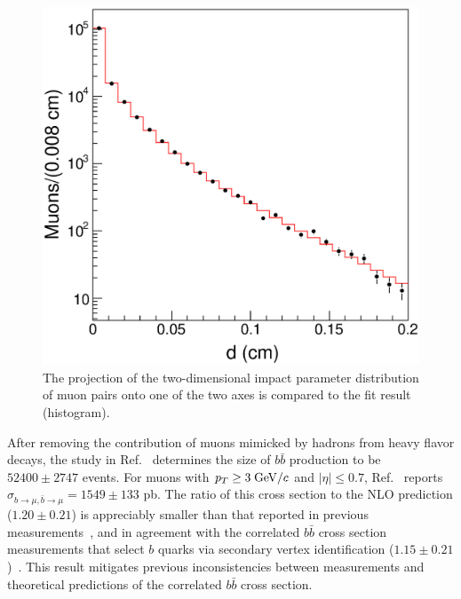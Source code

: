 \documentclass[aps,prd,preprint,floatfix,nofootinbib,superscriptaddress,showpacs,amssymb]{revtex4}
\begin{document}
 \begin{figure}[htb]
 \begin{center}
 \vspace{-0.2in}
 \leavevmode
 \includegraphics*[width=\textwidth]{fig_6.eps}
 \caption[]{The projection of the  two-dimensional impact parameter
            distribution of muon pairs onto one of the two axes is 
            compared to the fit result (histogram).}
 \label{fig:figbb_6}
 \end{center}
 \end{figure}
 After removing the contribution of muons mimicked by hadrons from heavy 
 flavor decays, the study in Ref.~\cite{bbxs} determines the size of
 $b\bar{b}$ production to be $52400 \pm 2747$ events. For muons with
 $p_T \geq 3 \; {\rm GeV/}c$ and $|\eta| \leq 0.7$, Ref.~\cite{bbxs} reports
  $\sigma_{b\rightarrow\mu,\bar{b}\rightarrow \mu}= 1549 \pm 133$ pb.
 The ratio of this cross section to the NLO prediction ($1.20 \pm0.21$) is
 appreciably smaller than that reported in previous
 measurements~\cite{2mucdf,d0b2}, and in agreement with the correlated 
 $b \bar{b}$ cross section measurements that select $b$ quarks via
 secondary vertex identification ($1.15 \pm 0.21$)~\cite{ajets,shears}.
 This result mitigates previous inconsistencies between measurements and 
 theoretical predictions of the correlated $b\bar{b}$ cross section. 
 
\end{document}
